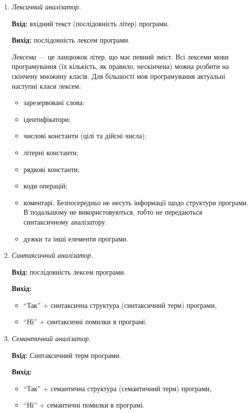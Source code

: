 \begin{enumerate}
	\item \textit{Лексичний аналізатор.} \medskip
	
	\textbf{Вхід:} вхідний текст (послідовність літер) програми. \medskip

	\textbf{Вихід:} послідовність лексем програми. \medskip

	\textit{Лексема} --- це ланцюжок літер, що має певний зміст. Всі лексеми мови програмування (їх кількість, як правило, нескінчена) можна розбити на скінчену 	множину класів. Для більшості мов програмування актуальні наступні класи лексем:
	\begin{itemize}
		\item зарезервовані слова;
		\item ідентифікатори;
		\item числові константи (цілі та дійсні числа);
		\item літерні константи;
		\item рядкові константи;
		\item коди операцій;
		\item коментарі. Безпосередньо не несуть інформації щодо структури 		програми. В подальшому не використовуються, тобто не передаються 		синтаксичному аналізатору.
		\item дужки та інші елементи програми.
	\end{itemize}

	\item \textit{Синтаксичний аналізатор.} \medskip

	\textbf{Вхід:} послідовність лексем програми. \medskip
	
	\textbf{Вихід:}
	\begin{itemize}
		\item ``Так'' + синтаксична структура (синтаксичний терм) програми,
		\item ``Ні'' + синтаксичні помилки в програмі.
	\end{itemize}

	\item \textit{Семантичний аналізатор.} \medskip

	\textbf{Вхід:} Синтаксичний терм програми. \medskip

	\textbf{Вихід:} \medskip
	\begin{itemize}
		\item ``Так'' + семантична структура (семантичний терм) програми,
		\item ``Ні'' + семантичні помилки в програмі.
	\end{itemize}


\end{enumerate}
